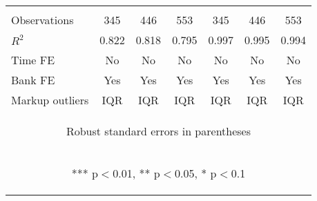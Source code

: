 \begin{tabular}{lcccccc}
\vspace{4pt} & \begin{footnotesize}\end{footnotesize} & \begin{footnotesize}\end{footnotesize} & \begin{footnotesize}\end{footnotesize} & \begin{footnotesize}\end{footnotesize} & \begin{footnotesize}\end{footnotesize} & \begin{footnotesize}\end{footnotesize} \\
Observations & 345 & 446 & 553 & 345 & 446 & 553 \\
$R^2$ & 0.822 & 0.818 & 0.795 & 0.997 & 0.995 & 0.994 \\
Time FE & No & No & No & No & No & No \\
Bank FE & Yes & Yes & Yes & Yes & Yes & Yes \\
 Markup outliers & IQR & IQR & IQR & IQR & IQR & IQR \\ \hline
\multicolumn{7}{c}{\begin{footnotesize} Robust standard errors in parentheses\end{footnotesize}} \\
\multicolumn{7}{c}{\begin{footnotesize} *** p$<$0.01, ** p$<$0.05, * p$<$0.1\end{footnotesize}} \\
\end{tabular}


